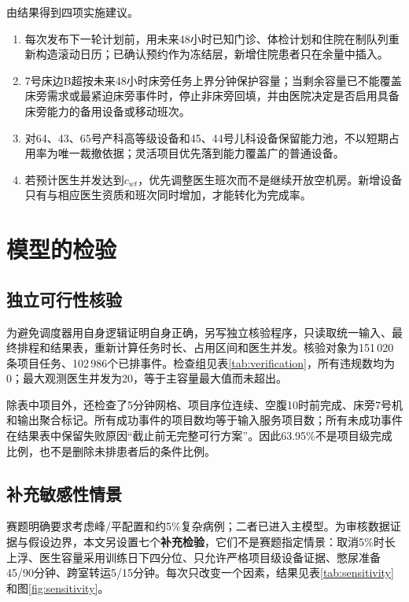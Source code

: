 由结果得到四项实施建议。

\begin{enumerate}
  \item 每次发布下一轮计划前，用未来48小时已知门诊、体检计划和住院在制队列重新构造滚动日历；已确认预约作为冻结层，新增住院患者只在余量中插入。
  \item 7号床边B超按未来48小时床旁任务上界分钟保护容量；当剩余容量已不能覆盖床旁需求或最紧迫床旁事件时，停止非床旁回填，并由医院决定是否启用具备床旁能力的备用设备或移动班次。
  \item 对64、43、65号产科高等级设备和45、44号儿科设备保留能力池，不以短期占用率为唯一裁撤依据；灵活项目优先落到能力覆盖广的普通设备。
  \item 若预计医生并发达到$c_{wt}$，优先调整医生班次而不是继续开放空机房。新增设备只有与相应医生资质和班次同时增加，才能转化为完成率。
\end{enumerate}

\section{模型的检验}

\subsection{独立可行性核验}

为避免调度器用自身逻辑证明自身正确，另写独立核验程序，只读取统一输入、最终排程和结果表，重新计算任务时长、占用区间和医生并发。核验对象为151\,020条项目任务、102\,986个已排事件。检查组见表\ref{tab:verification}，所有违规数均为0；最大观测医生并发为20，等于主容量最大值而未超出。

\begin{table}[H]
  \centering
  \caption{最终联合排程的独立核验结果}
  \label{tab:verification}
  
\end{table}

除表中项目外，还检查了5分钟网格、项目序位连续、空腹10时前完成、床旁7号机和输出聚合标记。所有成功事件的项目数均等于输入服务项目数；所有未成功事件在结果表中保留失败原因“截止前无完整可行方案”。因此63.95\%不是项目级完成比例，也不是删除未排患者后的条件比例。

\subsection{补充敏感性情景}

赛题明确要求考虑峰/平配置和约5\%复杂病例；二者已进入主模型。为审核数据证据与假设边界，本文另设置七个\textbf{补充检验}，它们不是赛题指定情景：取消5\%时长上浮、医生容量采用训练日下四分位、只允许严格项目级设备证据、憋尿准备45/90分钟、跨室转运5/15分钟。每次只改变一个因素，结果见表\ref{tab:sensitivity}和图\ref{fig:sensitivity}。

